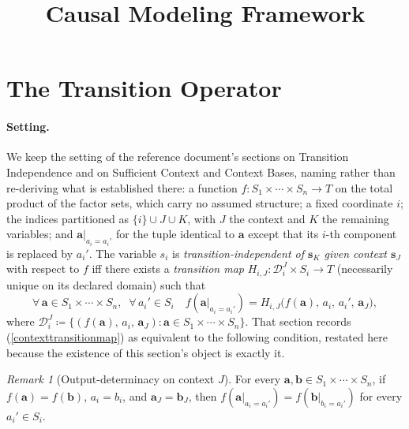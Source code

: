 \documentclass{article}
\title{Causal Modeling Framework}
\author{}
\date{}
\theoremstyle{definition}
\theoremstyle{remark}
\newtheorem{remark}[proposition]{Remark}
\begin{document}
\maketitle

\begin{abstract}
\end{abstract}

\newpage
\section{The Transition Operator}
\label{transitionoperator}

\paragraph{Setting.} We keep the setting of the reference document's sections on Transition Independence and on Sufficient Context and Context Bases, naming rather than re-deriving what is established there: a function $f \colon S_1 \times \cdots \times S_n \to T$ on the total product of the factor sets, which carry no assumed structure; a fixed coordinate $i$; the indices partitioned as $\{i\} \cup J \cup K$, with $J$ the context and $K$ the remaining variables; and $\boldsymbol{a}|_{a_i = a_i'}$ for the tuple identical to $\boldsymbol{a}$ except that its $i$-th component is replaced by $a_i'$. The variable $s_i$ is \textit{transition-independent of $\boldsymbol{s}_K$ given context $\boldsymbol{s}_J$} with respect to $f$ iff there exists a \textit{transition map} $H_{i,J} \colon \mathcal{D}_i^J \times S_i \to T$ (necessarily unique on its declared domain) such that
\begin{equation}
\label{contexttransitionmap}
\forall\, \boldsymbol{a} \in S_1 \times \cdots \times S_n,\;\; \forall\, a_i' \in S_i \quad
f(\boldsymbol{a}|_{a_i = a_i'}) = H_{i,J}\bigl(f(\boldsymbol{a}),\, a_i,\, a_i',\, \boldsymbol{a}_J\bigr),
\end{equation}
where $\mathcal{D}_i^J \coloneqq \{(f(\boldsymbol{a}),\, a_i,\, \boldsymbol{a}_J) : \boldsymbol{a} \in S_1 \times \cdots \times S_n\}$. That section records (\ref{contexttransitionmap}) as equivalent to the following condition, restated here because the existence of this section's object is exactly it.

\begin{remark}[Output-determinacy on context $J$]
\label{contextoutputdeterminacy}
For every $\boldsymbol{a}, \boldsymbol{b} \in S_1 \times \cdots \times S_n$, if $f(\boldsymbol{a}) = f(\boldsymbol{b})$, $a_i = b_i$, and $\boldsymbol{a}_J = \boldsymbol{b}_J$, then $f(\boldsymbol{a}|_{a_i = a_i'}) = f(\boldsymbol{b}|_{b_i = a_i'})$ for every $a_i' \in S_i$.
\end{remark}
\end{document}
